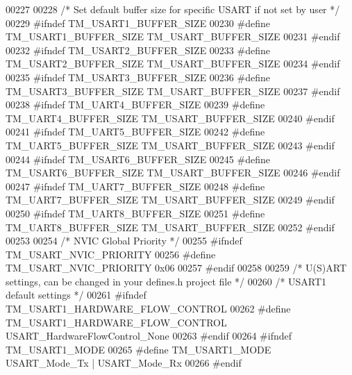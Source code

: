 \begin{DoxyCode}
00227 
00228 \textcolor{comment}{/* Set default buffer size for specific USART if not set by user */}
00229 \textcolor{preprocessor}{#ifndef TM\_USART1\_BUFFER\_SIZE}
00230 \textcolor{preprocessor}{#define TM\_USART1\_BUFFER\_SIZE               TM\_USART\_BUFFER\_SIZE}
00231 \textcolor{preprocessor}{#endif}
00232 \textcolor{preprocessor}{#ifndef TM\_USART2\_BUFFER\_SIZE}
00233 \textcolor{preprocessor}{#define TM\_USART2\_BUFFER\_SIZE               TM\_USART\_BUFFER\_SIZE}
00234 \textcolor{preprocessor}{#endif}
00235 \textcolor{preprocessor}{#ifndef TM\_USART3\_BUFFER\_SIZE}
00236 \textcolor{preprocessor}{#define TM\_USART3\_BUFFER\_SIZE               TM\_USART\_BUFFER\_SIZE}
00237 \textcolor{preprocessor}{#endif}
00238 \textcolor{preprocessor}{#ifndef TM\_UART4\_BUFFER\_SIZE}
00239 \textcolor{preprocessor}{#define TM\_UART4\_BUFFER\_SIZE                TM\_USART\_BUFFER\_SIZE}
00240 \textcolor{preprocessor}{#endif}
00241 \textcolor{preprocessor}{#ifndef TM\_UART5\_BUFFER\_SIZE}
00242 \textcolor{preprocessor}{#define TM\_UART5\_BUFFER\_SIZE                TM\_USART\_BUFFER\_SIZE}
00243 \textcolor{preprocessor}{#endif}
00244 \textcolor{preprocessor}{#ifndef TM\_USART6\_BUFFER\_SIZE}
00245 \textcolor{preprocessor}{#define TM\_USART6\_BUFFER\_SIZE               TM\_USART\_BUFFER\_SIZE}
00246 \textcolor{preprocessor}{#endif}
00247 \textcolor{preprocessor}{#ifndef TM\_UART7\_BUFFER\_SIZE}
00248 \textcolor{preprocessor}{#define TM\_UART7\_BUFFER\_SIZE                TM\_USART\_BUFFER\_SIZE}
00249 \textcolor{preprocessor}{#endif}
00250 \textcolor{preprocessor}{#ifndef TM\_UART8\_BUFFER\_SIZE}
00251 \textcolor{preprocessor}{#define TM\_UART8\_BUFFER\_SIZE                TM\_USART\_BUFFER\_SIZE}
00252 \textcolor{preprocessor}{#endif}
00253 
00254 \textcolor{comment}{/* NVIC Global Priority */}
00255 \textcolor{preprocessor}{#ifndef TM\_USART\_NVIC\_PRIORITY}
00256 \textcolor{preprocessor}{#define TM\_USART\_NVIC\_PRIORITY              0x06}
00257 \textcolor{preprocessor}{#endif}
00258 
00259 \textcolor{comment}{/* U(S)ART settings, can be changed in your defines.h project file */}
00260 \textcolor{comment}{/* USART1 default settings */}
00261 \textcolor{preprocessor}{#ifndef TM\_USART1\_HARDWARE\_FLOW\_CONTROL}
00262 \textcolor{preprocessor}{#define TM\_USART1\_HARDWARE\_FLOW\_CONTROL     USART\_HardwareFlowControl\_None}
00263 \textcolor{preprocessor}{#endif}
00264 \textcolor{preprocessor}{#ifndef TM\_USART1\_MODE}
00265 \textcolor{preprocessor}{#define TM\_USART1\_MODE                      USART\_Mode\_Tx | USART\_Mode\_Rx}
00266 \textcolor{preprocessor}{#endif}

\end{DoxyCode}
